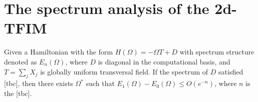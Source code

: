 \chapter{The spectrum analysis of the 2d-TFIM}



\begin{theorem}
Given a Hamiltonian with the form $H(\Omega) = -\Omega T + D$ with spectrum structure denoted as $E_n(\Omega)$, where $D$ is diagonal in the computational basis, and $T = \sum_{j} X_j$ is globally uniform transversal field. If the spectrum of $D$ satisfied [tbc], then there exists $\Omega^*$ such that $E_1(\Omega) - E_0(\Omega) \leq O(e^{-n})$, where $n$ is the [tbc].
\end{theorem}

